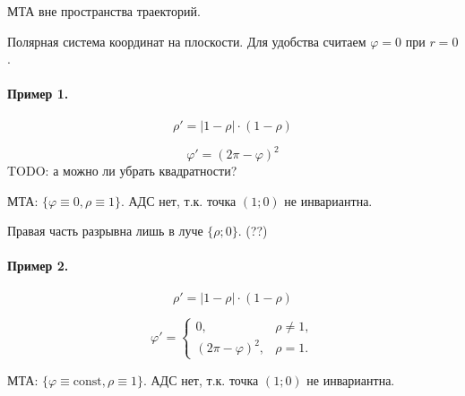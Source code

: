 
\LARGE



МТА вне пространства траекторий.

Полярная система координат на плоскости.
Для удобства считаем $\varphi = 0$ при $r=0$.

\paragraph{Пример 1.}


\begin{equation}
	\rho' = |1-\rho| \cdot (1-\rho)
\end{equation}

\begin{equation}
	\varphi' = (2\pi - \varphi)^2
\end{equation}
TODO: а можно ли убрать квадратности?



МТА: $\{\varphi \equiv 0, \rho \equiv 1\}$.
АДС нет, т.к. точка $(1;0)$ не инвариантна.

Правая часть разрывна лишь в луче $\{\rho; 0\}$.
(??)

\paragraph{Пример 2.}

\begin{equation}
	\rho' = |1-\rho| \cdot (1-\rho)
\end{equation}


\begin{equation}
	\varphi' = \begin{cases}
		0, & \rho \neq 1,
		\\
		(2\pi - \varphi)^2, & \rho = 1
		.
	\end{cases}
\end{equation}

МТА: $\{\varphi \equiv \mathrm{const}, \rho \equiv 1\}$.
АДС нет, т.к. точка $(1;0)$ не инвариантна.



